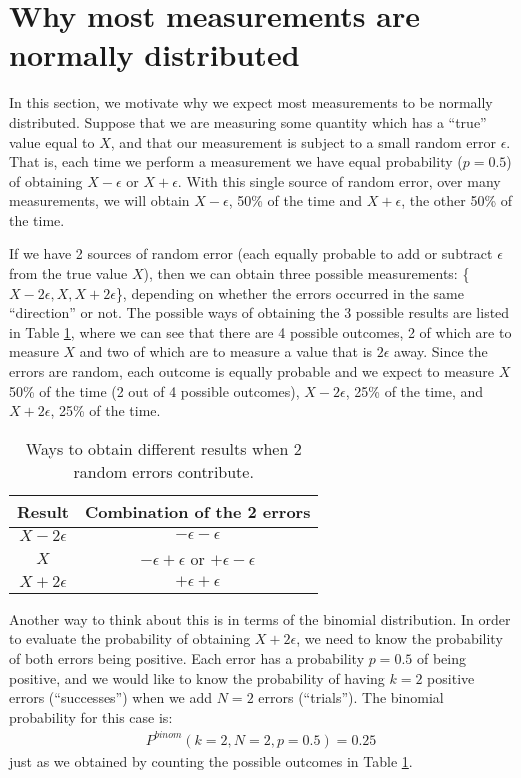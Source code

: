 \section{Why most measurements are normally distributed}
In this section, we motivate why we expect most measurements to be normally distributed. Suppose that we are measuring some quantity which has a ``true'' value equal to $X$, and that our measurement is subject to a small random error $\epsilon$. That is, each time we perform a measurement we have equal probability ($p=0.5$) of obtaining $X-\epsilon$ or $X+\epsilon$. With this single source of random error, over many measurements, we will obtain $X-\epsilon$, 50\% of the time and $X+\epsilon$, the other 50\% of the time.

 If we have 2 sources of random error (each equally probable to add or subtract $\epsilon$ from the true value $X$), then we can obtain three possible measurements: \{$X-2\epsilon,X,X+2\epsilon$\}, depending on whether the errors occurred in the same ``direction'' or not. The possible ways of obtaining the 3 possible results are listed in Table \ref{tab:twoerrors}, where we can see that there are 4 possible outcomes, 2 of which are to measure $X$ and two of which are to measure a value that is $2\epsilon$ away. Since the errors are random, each outcome is equally probable and we expect to measure $X$ 50\% of the time (2 out of 4 possible outcomes), $X-2\epsilon$, 25\% of the time, and $X+2\epsilon$, 25\% of the time.  
 
\begin{table}[h!]
\center
\begin{tabular}{|c|c|}
\hline
\textbf{Result} & \textbf{Combination of the 2 errors}\\
\hline
$X-2\epsilon$ & $-\epsilon-\epsilon$\\
$X$ & $-\epsilon+\epsilon$ or $+\epsilon-\epsilon$\\
$X+2\epsilon$ & $+\epsilon+\epsilon$\\
\hline
\end{tabular}
\caption{\label{tab:twoerrors}Ways to obtain different results when 2 random errors contribute.}
\end{table}

Another way to think about this is in terms of the binomial distribution. In order to evaluate the probability of obtaining $X+2\epsilon$, we need to know the probability of both errors being positive. Each error has a probability $p=0.5$ of being positive, and we would like to know the probability of having $k=2$ positive errors (``successes'') when we add $N=2$ errors (``trials''). The binomial probability for this case is:
\begin{align*}
P^{binom}(k=2,N=2,p=0.5)=0.25
\end{align*} 
just as we obtained by counting the possible outcomes in Table \ref{tab:twoerrors}.


